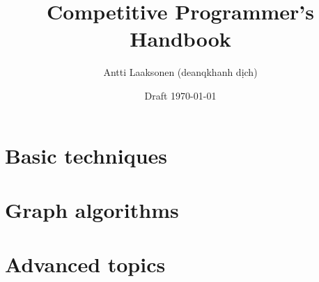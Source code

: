 \documentclass[twoside,12pt,a4paper,openany,vietnamese]{book}
\date{Draft \today}
\title{\Huge Competitive Programmer's Handbook}
\author{\Large Antti Laaksonen (deanqkhanh dịch)}
\begin{document}


\frontmatter
\maketitle
\setcounter{tocdepth}{1}
\tableofcontents



\mainmatter
{}
\setcounter{page}{1}

\part{Basic techniques}










\part{Graph algorithms}










\part{Advanced topics}











\clearpage
{}
{}



\cleardoublepage
\printindex
\end{document}

